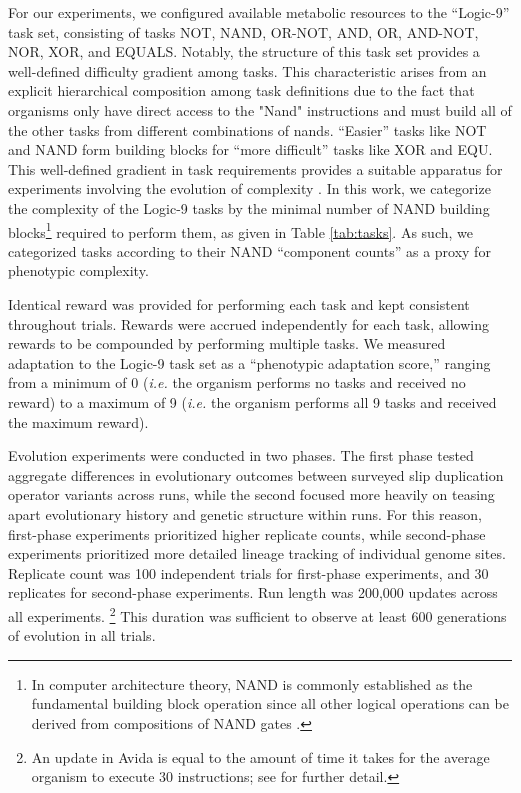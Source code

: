 For our experiments, we configured available metabolic resources to the ``Logic-9'' task set, consisting of tasks NOT, NAND, OR-NOT, AND, OR, AND-NOT, NOR, XOR, and EQUALS.
Notably, the structure of this task set provides a well-defined difficulty gradient among tasks.
This characteristic arises from an explicit hierarchical composition among task definitions due to the fact that organisms only have direct access to the "Nand" instructions and must build all of the other tasks from different combinations of nands.
``Easier'' tasks like NOT and NAND form building blocks for ``more difficult'' tasks like XOR and EQU.
This well-defined gradient in task requirements provides a suitable apparatus for experiments involving the evolution of complexity \citep{lenski2003evolutionary}.
In this work, we categorize the complexity of the Logic-9 tasks by the minimal number of NAND building blocks\footnote{
In computer architecture theory, NAND is commonly established as the fundamental building block operation since all other logical operations can be derived from compositions of NAND gates \citep{mano1997logic}.
} required to perform them, as given in Table \ref{tab:tasks}.
As such, we categorized tasks according to their NAND ``component counts'' as a proxy for phenotypic complexity.

Identical reward was provided for performing each task and kept consistent throughout trials.
Rewards were accrued independently for each task, allowing rewards to be compounded by performing multiple tasks.
We measured adaptation to the Logic-9 task set as a ``phenotypic adaptation score,'' ranging from a minimum of 0 (\textit{i.e.} the organism performs no tasks and received no reward) to a maximum of 9 (\textit{i.e.} the organism performs all 9 tasks and received the maximum reward).

Evolution experiments were conducted in two phases.
The first phase tested aggregate differences in evolutionary outcomes between surveyed slip duplication operator variants across runs, while the second focused more heavily on teasing apart evolutionary history and genetic structure within runs.
For this reason, first-phase experiments prioritized higher replicate counts, while second-phase experiments prioritized more detailed lineage tracking of individual genome sites.
Replicate count was 100 independent trials for first-phase experiments, and 30 replicates for second-phase experiments.
Run length was 200,000 updates across all experiments.
\footnote{An update in Avida is equal to the amount of time it takes for the average organism to execute 30 instructions; see \citep{Ofria:2009avida} for further detail.}
This duration was sufficient to observe at least 600 generations of evolution in all trials.

